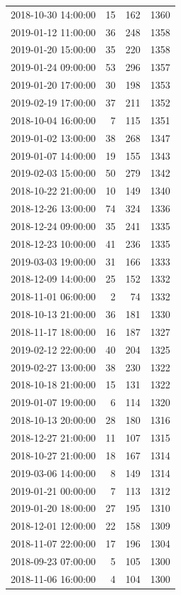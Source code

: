 \begin{tabular}{lrrr}
2018-10-30 14:00:00 & 15 & 162 & 1360 \\
2019-01-12 11:00:00 & 36 & 248 & 1358 \\
2019-01-20 15:00:00 & 35 & 220 & 1358 \\
2019-01-24 09:00:00 & 53 & 296 & 1357 \\
2019-01-20 17:00:00 & 30 & 198 & 1353 \\
2019-02-19 17:00:00 & 37 & 211 & 1352 \\
2018-10-04 16:00:00 & 7 & 115 & 1351 \\
2019-01-02 13:00:00 & 38 & 268 & 1347 \\
2019-01-07 14:00:00 & 19 & 155 & 1343 \\
2019-02-03 15:00:00 & 50 & 279 & 1342 \\
2018-10-22 21:00:00 & 10 & 149 & 1340 \\
2018-12-26 13:00:00 & 74 & 324 & 1336 \\
2018-12-24 09:00:00 & 35 & 241 & 1335 \\
2018-12-23 10:00:00 & 41 & 236 & 1335 \\
2019-03-03 19:00:00 & 31 & 166 & 1333 \\
2018-12-09 14:00:00 & 25 & 152 & 1332 \\
2018-11-01 06:00:00 & 2 & 74 & 1332 \\
2018-10-13 21:00:00 & 36 & 181 & 1330 \\
2018-11-17 18:00:00 & 16 & 187 & 1327 \\
2019-02-12 22:00:00 & 40 & 204 & 1325 \\
2019-02-27 13:00:00 & 38 & 230 & 1322 \\
2018-10-18 21:00:00 & 15 & 131 & 1322 \\
2019-01-07 19:00:00 & 6 & 114 & 1320 \\
2018-10-13 20:00:00 & 28 & 180 & 1316 \\
2018-12-27 21:00:00 & 11 & 107 & 1315 \\
2018-10-27 21:00:00 & 18 & 167 & 1314 \\
2019-03-06 14:00:00 & 8 & 149 & 1314 \\
2019-01-21 00:00:00 & 7 & 113 & 1312 \\
2019-01-20 18:00:00 & 27 & 195 & 1310 \\
2018-12-01 12:00:00 & 22 & 158 & 1309 \\
2018-11-07 22:00:00 & 17 & 196 & 1304 \\
2018-09-23 07:00:00 & 5 & 105 & 1300 \\
2018-11-06 16:00:00 & 4 & 104 & 1300 \\

\end{tabular}
